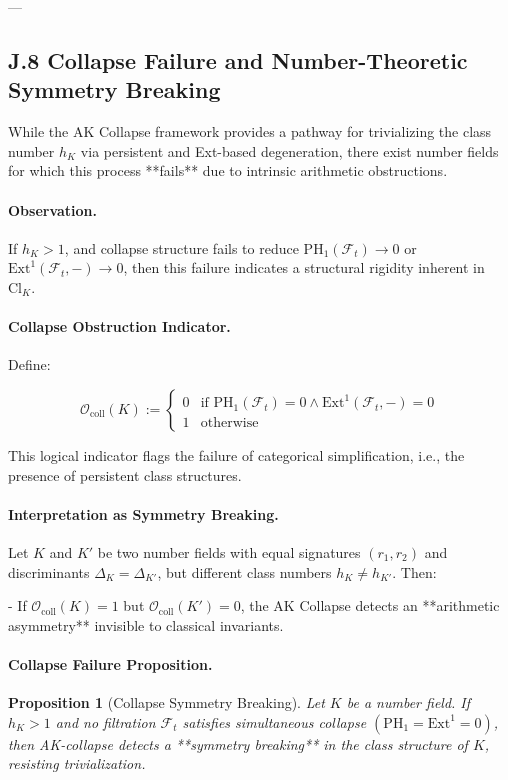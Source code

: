 \documentclass[11pt]{article}
\newtheorem{proposition}[theorem]{Proposition}
\begin{document}
---

\subsection*{J.8 Collapse Failure and Number-Theoretic Symmetry Breaking}

While the AK Collapse framework provides a pathway for trivializing the class number \( h_K \) via persistent and Ext-based degeneration, there exist number fields for which this process **fails** due to intrinsic arithmetic obstructions.

\paragraph{Observation.}
If \( h_K > 1 \), and collapse structure fails to reduce \( \mathrm{PH}_1(\mathcal{F}_t) \to 0 \) or \( \mathrm{Ext}^1(\mathcal{F}_t, -) \to 0 \), then this failure indicates a structural rigidity inherent in \( \mathrm{Cl}_K \).

\paragraph{Collapse Obstruction Indicator.}
Define:

\[
\mathcal{O}_{\mathrm{coll}}(K) := 
\left\{
  \begin{array}{ll}
    0 & \text{if } \mathrm{PH}_1(\mathcal{F}_t) = 0 \wedge \mathrm{Ext}^1(\mathcal{F}_t, -) = 0 \\
    1 & \text{otherwise}
  \end{array}
\right.
\]

This logical indicator flags the failure of categorical simplification, i.e., the presence of persistent class structures.

\paragraph{Interpretation as Symmetry Breaking.}
Let \( K \) and \( K' \) be two number fields with equal signatures \( (r_1, r_2) \) and discriminants \( \Delta_K = \Delta_{K'} \), but different class numbers \( h_K \ne h_{K'} \). Then:

- If \( \mathcal{O}_{\mathrm{coll}}(K) = 1 \) but \( \mathcal{O}_{\mathrm{coll}}(K') = 0 \),  
the AK Collapse detects an **arithmetic asymmetry** invisible to classical invariants.

\paragraph{Collapse Failure Proposition.}
\begin{proposition}[Collapse Symmetry Breaking]
Let \( K \) be a number field. If \( h_K > 1 \) and no filtration \( \mathcal{F}_t \) satisfies simultaneous collapse \( (\mathrm{PH}_1 = \mathrm{Ext}^1 = 0) \),  
then AK-collapse detects a **symmetry breaking** in the class structure of \( K \), resisting trivialization.
\end{proposition}
\end{document}

